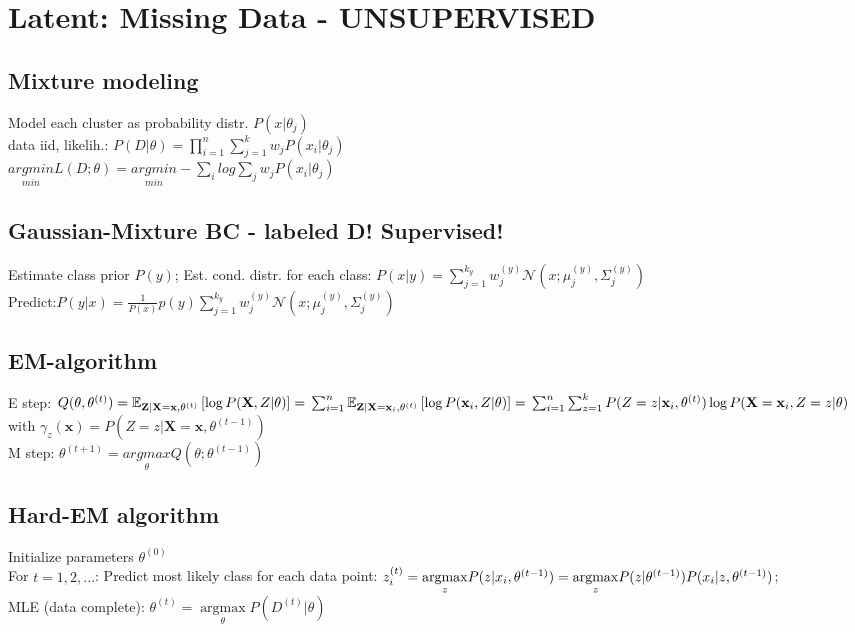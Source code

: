 \section*{Latent: Missing Data - UNSUPERVISED}
\subsection*{Mixture modeling}
Model each cluster as probability distr. $P(x|\theta_j)$\\
data iid, likelih.: $P(D|\theta) = \prod_{i=1}^n \sum_{j=1}^k w_j P(x_i|\theta_j)$\\
$\underset{min}{argmin}L(D;\theta) = \underset{min}{argmin} - \sum_i log \sum_j w_j P(x_i| \theta_j)$

\subsection*{Gaussian-Mixture BC - labeled D! Supervised!}
Estimate class prior $P(y)$; Est. cond. distr. for each class:
$P(x|y) = \sum_{j=1}^{k_y} w_j^{(y)} \mathcal{N}(x; \mu_j^{(y)}, \Sigma_j^{(y)})$\\
Predict:$P(y|x) = \frac{1}{P(x)} p(y) \sum_{j=1}^{k_y} w_j^{(y)} \mathcal{N}(x; \mu_j^{(y)}, \Sigma_j^{(y)})$

\subsection*{EM-algorithm}
E step: $Q(\theta, \theta^{(t)}) = \mathbb{E}_{\textbf{Z} | \textbf{X} = \textbf{x}, \theta^{(t)}}\left[\log P(\textbf{X}, Z | \theta)\right] = \\ \sum_{i=1}^n \mathbb{E}_{\textbf{Z} | \textbf{X} = \textbf{x}_i, \theta^{(t)}}\left[\log P(\textbf{x}_i, Z | \theta)\right] = \\ \sum_{i=1}^n \sum_{z=1}^k P(Z=z|\textbf{x}_i, \theta^{(t)}) \log P(\textbf{X} = \textbf{x}_i, Z=z | \theta)$
with $\gamma_z(\textbf{x}) = P(Z=z|\textbf{X}=\textbf{x}, \theta^{(t-1)})$\\
M step: $\theta^{(t+1)} = \underset{\theta}{argmax} Q(\theta; \theta^{(t-1)})$


\subsection*{Hard-EM algorithm}
Initialize parameters $\theta^{(0)}$\\
For $t=1,2,...$:
Predict most likely class for each data point:
$z_i^{(t)} = \underset{z}{\operatorname{argmax}} P(z|x_i, \theta^{(t-1)})\\
= \underset{z}{\operatorname{argmax}} P(z|\theta^{(t-1)}) P(x_i|z,\theta^{(t-1)})$;\\
MLE (data complete):
$\theta^{(t)} = \underset{\theta}{\operatorname{argmax}} P(D^{(t)}|\theta)$

